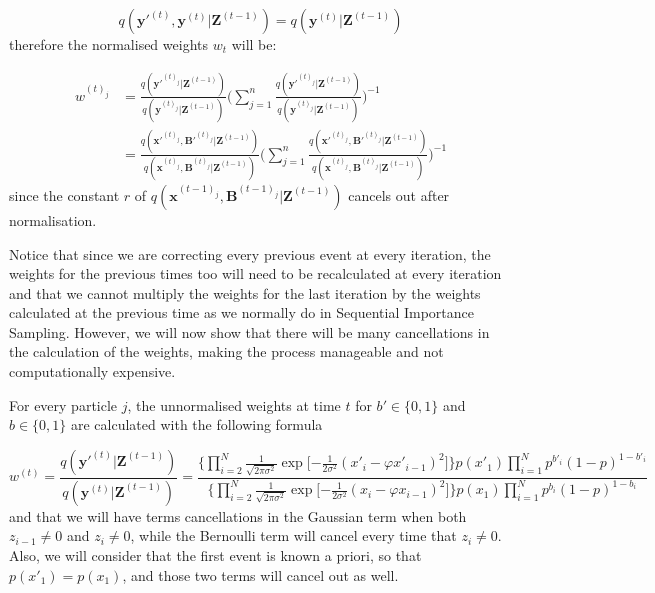 \documentclass[11pt,a4paper]{article}
\renewcommand{\vec}[1]{\mathbf{#1}}
\begin{document}
{\[
q(\vec{y'}^{(t)}, \vec{y}^{(t)} | \vec{Z}^{(t-1)}) = q(\vec{y}^{(t)} | \vec{Z}^{(t-1)})
\]
therefore the normalised weights $w_t$ will be:

\begin{align*}
w^{(t)_j} & = \frac{q(\vec{y'}^{(t)_j} | \vec{Z}^{(t-1)}) }{q(\vec{y}^{(t)_j} | \vec{Z}^{(t-1)})}\Bigg( \sum_{j=1}^n  \frac{q(\vec{y'}^{(t)_j} | \vec{Z}^{(t-1)}) }{q(\vec{y}^{(t)_j} | \vec{Z}^{(t-1)})}\Bigg)^{-1} \\
& = \frac{q(\vec{x'}^{(t)_j}, \vec{B'}^{(t)_j} | \vec{Z}^{(t-1)}) }{q(\vec{x}^{(t)_j}, \vec{B}^{(t)_j} | \vec{Z}^{(t-1)})}\Bigg( \sum_{j=1}^n \frac{q(\vec{x'}^{(t)_j}, \vec{B'}^{(t)_j} | \vec{Z}^{(t-1)}) }{q(\vec{x}^{(t)_j}, \vec{B}^{(t)_j} | \vec{Z}^{(t-1)})}\Bigg)^{-1}
\end{align*}
since the constant $r$ of $q(\vec{x}^{(t-1)_j},\vec{B}^{(t-1)_j} | \vec{Z}^{(t-1)})$ cancels out after normalisation.

Notice that since we are correcting every previous event at every iteration, the weights for the previous times too will need to be recalculated at every iteration and that we cannot multiply the weights for the last iteration by the weights calculated at the previous time as we normally do in Sequential Importance Sampling. However, we will now show that there will be many cancellations in the calculation of the weights, making the process manageable and not computationally expensive.

For every particle $j$, the unnormalised weights at time $t$ for $b' \in \{0,1\}$ and $b \in \{0,1\}$ are calculated with the following formula

\[
w^{(t)} = \frac{q(\vec{y'}^{(t)} | \vec{Z}^{(t-1)}) }{q(\vec{y}^{(t)} | \vec{Z}^{(t-1)})} = \frac{\bigg \{ \prod_{i=2}^{N}  \frac{1}{\sqrt{2 \pi \sigma^{2}}} \exp \bigg [ { - \frac{1}{2 \sigma^{2}} }  (x'_{i} - \varphi x'_{i-1})^{2} \bigg ] \bigg \} p(x'_{1}) \prod_{i=1}^{N} p^{b'_i} (1 - p)^{1-b'_{i}}  }{\bigg \{ \prod_{i=2}^{N}  \frac{1}{\sqrt{2 \pi \sigma^{2}}} \exp \bigg [ { - \frac{1}{2 \sigma^{2}} }  (x_{i} - \varphi x_{i-1})^{2} \bigg ] \bigg \} p(x_{1}) \prod_{i=1}^{N} p^{b_i} (1 - p)^{1-b_{i}} }
\]
and that we will have terms cancellations in the Gaussian term when both $z_{i-1} \neq 0$ and $z_{i} \neq 0$, while the Bernoulli term will cancel every time that $z_{i} \neq 0$. Also, we will consider that the first event is known a priori, so that $p(x'_1)=p(x_1)$, and those two terms will cancel out as well.



}
\end{document}
